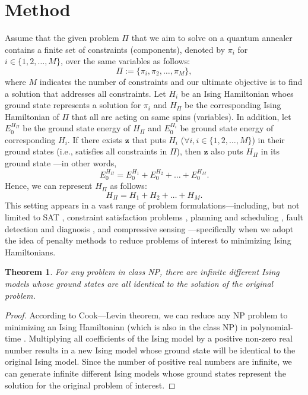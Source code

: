 \documentclass[fleqn,10pt]{wlscirep}
\newtheorem{theorem}{Theorem}
\begin{document}
\section*{Method}
Assume that the given problem $\Pi$ that we aim to solve on a quantum annealer contains a finite set of constraints (components), denoted by $\pi_i$ for $i \in \{1, 2, \dots, M \}$, over the same variables as follows: 
\begin{equation}
	\label{eqn:problem_constraints}
	\Pi := \{\pi_i, \pi_2, \dots, \pi_M \},
\end{equation}
where ${M}$ indicates the number of constraints and our ultimate objective is to find a solution that addresses all  constraints. Let $H_i$ be an Ising Hamiltonian whoes ground state represents a solution for $\pi_i$ and $H_{\Pi}$ be the corresponding Ising Hamiltonian of $\Pi$ that all are acting on same spins (variables). In addition, let $E_{0}^{H_{\Pi}}$ be the ground state energy of $H_{\Pi}$ and $E_0^{H_i}$ be ground state energy of corresponding $H_i$. If there exists $\mathbf{z}$ that puts $H_i$ ($\forall{i}, i \in \{1, 2, \dots, M\}$) in their ground states (i.e., satisfies all constraints in $\Pi$), then $\mathbf{z}$ also puts $H_{\Pi}$ in its ground state \cite{mooney2019mapping}—in other words, 
\begin{equation} 
	\label{eqn:hamiltonians_equality}
	E_0^{H_{\Pi}} = E_0^{H_1} + E_0^{H_2} + \dots + E_0^{H_M}.
\end{equation}
Hence, we can represent $H_{\Pi}$ as follows:
\begin{equation} 
	\label{eqn:hamiltonian_composition}
	H_{\Pi} = H_1 + H_2 + \dots + H_M.
\end{equation}
This setting appears in a vast range of problem formulations—including, but not limited to SAT \cite{bian2017solving}, constraint satisfaction problems \cite{vyskocil2018simple,vyskovcil2019embedding}, planning and scheduling \cite{rieffel2015case,venturelli2015quantum,tran2016hybrid}, fault detection and diagnosis \cite{perdomo2015quantum,bian2016mapping}, and compressive sensing \cite{ayanzadeh2019quantum,mousavi2019survey}—specifically when we adopt the idea of penalty methods to reduce problems of interest to minimizing Ising Hamiltonians.

\begin{theorem}
	\label{thm:infinite_Ising}
	For any problem in class NP, there are infinite different Ising models whose ground states are all identical to the solution of the original problem. 
\end{theorem}
\begin{proof}
	According to Cook—Levin theorem, we can reduce any NP problem to minimizing an Ising Hamiltonian (which is also in the class NP) in polynomial-time \cite{garey2002computers}. Multiplying all coefficients of the Ising model by a positive non-zero real number results in a new Ising model whose ground state will be identical to the original Ising model. Since the number of positive real numbers are infinite, we can generate infinite different Ising models whose ground states represent the solution for the original problem of interest. 
\end{proof}
\end{document}
